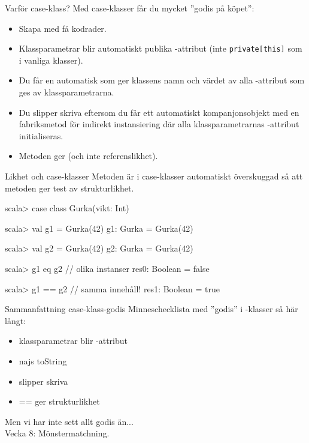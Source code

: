 
\ifkompendium\else





\begin{Slide}{Varför case-klass?}
Med case-klasser får du mycket ''godis på köpet'':
\begin{itemize}
\item Skapa  med få kodrader.
\item Klassparametrar blir automatiskt publika -attribut (inte \texttt{private[this]} som i vanliga klasser).
\item Du får en automatisk  som ger klassens namn och värdet av alla -attribut som ges av klassparametrarna.
\item Du slipper skriva  eftersom du får ett automatiskt kompanjonsobjekt med en fabriksmetod  för indirekt instansiering där alla klassparametrarnas -attribut initialiseras.
\item Metoden \code{==} ger  (och inte referenslikhet).
\end{itemize}
\end{Slide}



\begin{Slide}{Likhet och case-klasser}
Metoden  är i case-klasser automatiskt överskuggad så att metoden \code{==} ger test av strukturlikhet. 
\begin{REPL}
scala> case class Gurka(vikt: Int)

scala> val g1 = Gurka(42)
g1: Gurka = Gurka(42)

scala> val g2 = Gurka(42)
g2: Gurka = Gurka(42)

scala> g1 eq g2          // olika instanser
res0: Boolean = false

scala> g1 == g2          // samma innehåll!
res1: Boolean = true
\end{REPL}
\end{Slide}



\begin{Slide}{Sammanfattning case-klass-godis}
Minneschecklista med ''godis'' i -klasser så här långt:
\begin{itemize}
\item klassparametrar blir -attribut 
\item najs toString
\item slipper skriva 
\item == ger strukturlikhet
\end{itemize}

\pause
\vspace{3em}Men vi har inte sett allt godis än... \\Vecka 8: Mönstermatchning.
\end{Slide}



\fi